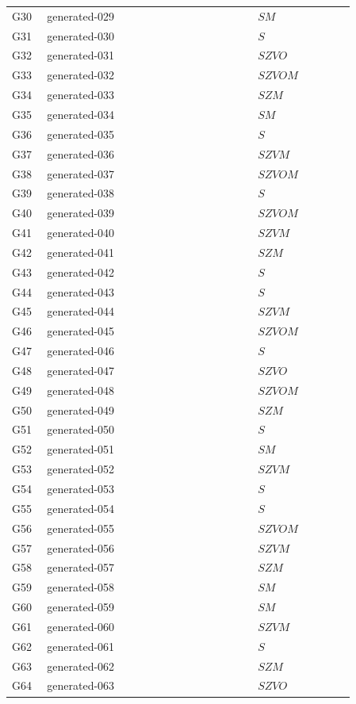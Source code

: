 \begin{longtable}{@{}p{0.09\linewidth}p{0.54\linewidth}p{0.25\linewidth}@{}}
G30 & generated-029 & $SM$\\
G31 & generated-030 & $S$\\
G32 & generated-031 & $SZVO$\\
G33 & generated-032 & $SZVOM$\\
G34 & generated-033 & $SZM$\\
G35 & generated-034 & $SM$\\
G36 & generated-035 & $S$\\
G37 & generated-036 & $SZVM$\\
G38 & generated-037 & $SZVOM$\\
G39 & generated-038 & $S$\\
G40 & generated-039 & $SZVOM$\\
G41 & generated-040 & $SZVM$\\
G42 & generated-041 & $SZM$\\
G43 & generated-042 & $S$\\
G44 & generated-043 & $S$\\
G45 & generated-044 & $SZVM$\\
G46 & generated-045 & $SZVOM$\\
G47 & generated-046 & $S$\\
G48 & generated-047 & $SZVO$\\
G49 & generated-048 & $SZVOM$\\
G50 & generated-049 & $SZM$\\
G51 & generated-050 & $S$\\
G52 & generated-051 & $SM$\\
G53 & generated-052 & $SZVM$\\
G54 & generated-053 & $S$\\
G55 & generated-054 & $S$\\
G56 & generated-055 & $SZVOM$\\
G57 & generated-056 & $SZVM$\\
G58 & generated-057 & $SZM$\\
G59 & generated-058 & $SM$\\
G60 & generated-059 & $SM$\\
G61 & generated-060 & $SZVM$\\
G62 & generated-061 & $S$\\
G63 & generated-062 & $SZM$\\
G64 & generated-063 & $SZVO$\\
\end{longtable}
